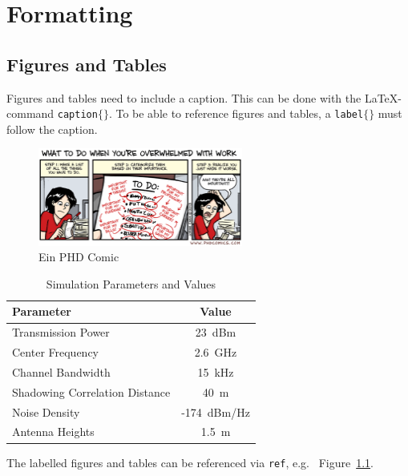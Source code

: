 \chapter{Formatting}

\section{Figures and Tables}
Figures and tables need to include a caption. This can be done with the LaTeX-command \texttt{\bslash caption$\lbrace\rbrace$}. To be able to reference figures and tables, a \texttt{\bslash label$\lbrace\rbrace$} must follow the caption.

\begin{figure}[h!]
  \begin{center}
    \includegraphics[width=0.6\textwidth]{phd112013s.eps}
    \caption{Ein PHD Comic}
    \label{fig:ToUseWithReference}
  \end{center}
\end{figure}

\begin{table}[b]
\begin{center}
\begin{tabular}{|l |c|}
\hline 
\textbf{Parameter} & \textbf{Value} \\
\hline  
\hline 
Transmission Power & 23~dBm\\
\hline 
Center Frequency & 2.6~GHz\\
\hline 
Channel Bandwidth & 15~kHz\\
\hline 
Shadowing Correlation Distance & 40~m\\
\hline 
Noise Density & -174~dBm/Hz\\
\hline 
Antenna Heights & 1.5~m\\
\hline 
\end{tabular}
\caption{Simulation Parameters and Values}\label{tab:param_table}
\end{center}
\end{table}

The labelled figures and tables can be referenced via \texttt{\bslash ref}, e.g. ~Figure~\ref{fig:ToUseWithReference}.